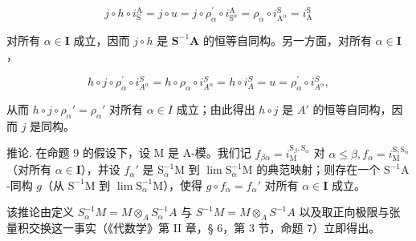 \[
j \circ h \circ i _ {\mathrm{S}} ^ {\mathrm{A}} = j \circ u = j \circ \rho_ {\alpha} ^ {\prime} \circ i _ {\mathrm{S} ^ {\alpha}} ^ {\mathrm{A}} = \rho_ {\alpha} \circ i _ {\mathrm{A} ^ {\alpha}} ^ {\mathrm{S}} = i _ {\mathrm{A}} ^ {\mathrm{S}}
\]

对所有 \(\alpha \in \mathbf{I}\) 成立，因而 \(j \circ h\) 是 \(\mathbf{S}^{-1}\mathbf{A}\) 的恒等自同构。另一方面，对所有 \(\alpha \in \mathbf{I}\)，

\[
h \circ j \circ \rho_ {\alpha} ^ {\prime} \circ i _ {A ^ {\alpha}} ^ {S} = h \circ \rho_ {\alpha} \circ i _ {A ^ {\alpha}} ^ {S} = h \circ i _ {A} ^ {S} = u = \rho_ {\alpha} ^ {\prime} \circ i _ {A ^ {\alpha}} ^ {S},
\]

从而 \(h \circ j \circ \rho_{\alpha}' = \rho_{\alpha}'\) 对所有 \(\alpha \in I\) 成立；由此得出 \(h \circ j\) 是 \(A'\) 的恒等自同构，因而 \(j\) 是同构。

推论. 在命题 9 的假设下，设 M 是 A-模。我们记 \(f_{\beta \alpha} = i_{\mathrm{M}}^{\mathrm{S}_{\beta},\mathrm{S}_{\alpha}}\) 对 \(\alpha \leqslant \beta, f_{\alpha} = i_{\mathrm{M}}^{\mathrm{S},\mathrm{S}_{\alpha}}\)（对所有 \(\alpha \in \mathbf{I}\)），并设 \(f_{\alpha}'\) 是 \(\mathrm{S}_{\alpha}^{-1}\mathrm{M}\) 到 \(\lim \mathrm{S}_{\alpha}^{-1}\mathrm{M}\) 的典范映射；则存在一个 \(\mathrm{S}^{-1}\mathrm{A}\)-同构 \(g\)（从 \(\mathrm{S}^{-1}\mathrm{M}\) 到 \(\lim \mathrm{S}_{\alpha}^{-1}\mathrm{M}\)），使得 \(g \circ f_{\alpha} = f_{\alpha}'\) 对所有 \(\alpha \in \mathbf{I}\) 成立。

该推论由定义 \(S_{\alpha}^{-1}M = M \otimes_{A} S_{\alpha}^{-1}A\) 与 \(S^{-1}M = M \otimes_{A} S^{-1}A\) 以及取正向极限与张量积交换这一事实（《代数学》第 II 章，§ 6，第 3 节，命题 7）立即得出。

